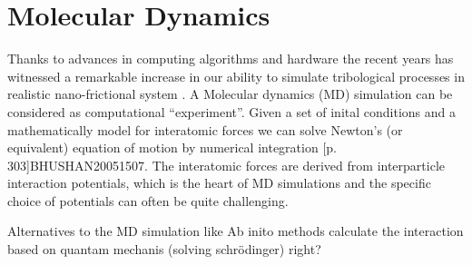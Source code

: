 \chapter{Molecular Dynamics}

Thanks to advances in computing algorithms and hardware the recent years has witnessed a remarkable increase in our ability to simulate tribological processes in realistic nano-frictional system \cite{Manini_2016}. A Molecular dynamics (MD) simulation can be considered as computational ``experiment''. Given a set of inital conditions and a mathematically model for interatomic forces we can solve Newton's (or equivalent) equation of motion by numerical integration [p. 303]{BHUSHAN20051507}. The interatomic forces are derived from interparticle interaction potentials, which is the heart of MD simulations and the specific choice of potentials can often be quite challenging.


Alternatives to the MD simulation like Ab inito methods calculate the interaction based on quantam mechanis (solving schrödinger) right?


















